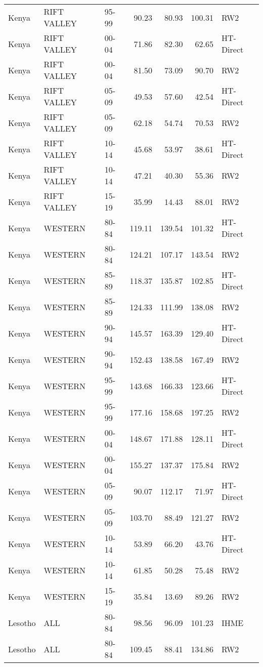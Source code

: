 \begin{longtable}{lllrrrl}
  Kenya & RIFT VALLEY & 95-99 & 90.23 & 80.93 & 100.31 & RW2 \\ 
  Kenya & RIFT VALLEY & 00-04 & 71.86 & 82.30 & 62.65 & HT-Direct \\ 
  Kenya & RIFT VALLEY & 00-04 & 81.50 & 73.09 & 90.70 & RW2 \\ 
  Kenya & RIFT VALLEY & 05-09 & 49.53 & 57.60 & 42.54 & HT-Direct \\ 
  Kenya & RIFT VALLEY & 05-09 & 62.18 & 54.74 & 70.53 & RW2 \\ 
  Kenya & RIFT VALLEY & 10-14 & 45.68 & 53.97 & 38.61 & HT-Direct \\ 
  Kenya & RIFT VALLEY & 10-14 & 47.21 & 40.30 & 55.36 & RW2 \\ 
  Kenya & RIFT VALLEY & 15-19 & 35.99 & 14.43 & 88.01 & RW2 \\ 
  Kenya & WESTERN & 80-84 & 119.11 & 139.54 & 101.32 & HT-Direct \\ 
  Kenya & WESTERN & 80-84 & 124.21 & 107.17 & 143.54 & RW2 \\ 
  Kenya & WESTERN & 85-89 & 118.37 & 135.87 & 102.85 & HT-Direct \\ 
  Kenya & WESTERN & 85-89 & 124.33 & 111.99 & 138.08 & RW2 \\ 
  Kenya & WESTERN & 90-94 & 145.57 & 163.39 & 129.40 & HT-Direct \\ 
  Kenya & WESTERN & 90-94 & 152.43 & 138.58 & 167.49 & RW2 \\ 
  Kenya & WESTERN & 95-99 & 143.68 & 166.33 & 123.66 & HT-Direct \\ 
  Kenya & WESTERN & 95-99 & 177.16 & 158.68 & 197.25 & RW2 \\ 
  Kenya & WESTERN & 00-04 & 148.67 & 171.88 & 128.11 & HT-Direct \\ 
  Kenya & WESTERN & 00-04 & 155.27 & 137.37 & 175.84 & RW2 \\ 
  Kenya & WESTERN & 05-09 & 90.07 & 112.17 & 71.97 & HT-Direct \\ 
  Kenya & WESTERN & 05-09 & 103.70 & 88.49 & 121.27 & RW2 \\ 
  Kenya & WESTERN & 10-14 & 53.89 & 66.20 & 43.76 & HT-Direct \\ 
  Kenya & WESTERN & 10-14 & 61.85 & 50.28 & 75.48 & RW2 \\ 
  Kenya & WESTERN & 15-19 & 35.84 & 13.69 & 89.26 & RW2 \\ 
  Lesotho & ALL & 80-84 & 98.56 & 96.09 & 101.23 & IHME \\ 
  Lesotho & ALL & 80-84 & 109.45 & 88.41 & 134.86 & RW2 \\ 

\end{longtable}
